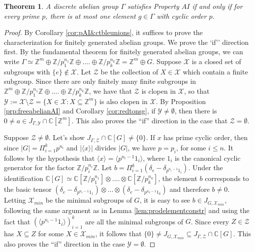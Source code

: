 \documentclass[a4paper, 12pt]{amsart}
\newtheorem{thm}{Theorem}[section]
\theoremstyle{definition}
\theoremstyle{remark}
\numberwithin{equation}{section}
\begin{document}
\begin{thm}
\label{thm:abeliancharAI}
    A discrete abelian group $\Gamma$ satisfies Property $AI$ if and only if for every prime $p$, there is at most one element $g\in \Gamma$ with cyclic order $p$.
\end{thm}
\begin{proof}
    By Corollary \ref{cor:pAI&ctbleunions}, it suffices to prove the characterization for finitely generated abelian groups. We prove the `if'' direction first. By the fundamental theorem for finitely generated abelian groups, we can write $\Gamma\simeq \mathbb{Z}^{m}\oplus \mathbb{Z}/p^{n_{1}}_{1}\mathbb{Z}\oplus....\oplus\mathbb{Z}/p_{k}^{n_{k}}\mathbb{Z} = \mathbb{Z}^{m}\oplus G$. Suppose $\mathcal{X}$ is a closed set of subgroups with $\{e\}\notin \mathcal{X}$. Let $\mathcal{Z}$ be the collection of $X\in\mathcal{X}$ which contain a finite subgroup. Since there are only finitely many finite subgroups in $\mathbb{Z}^{m}\oplus \mathbb{Z}/p^{n_{1}}_{1}\mathbb{Z}\oplus....\oplus\mathbb{Z}/p_{k}^{n_{k}}\mathbb{Z}$, we have that $\mathcal{Z}$ is clopen in $\mathcal{X}$, so that $\mathcal{Y} := \mathcal{X}\setminus \mathcal{Z} = \{X\in \mathcal{X}: X\subseteq \mathbb{Z}^{m}\}$ is also clopen in $\mathcal{X}$. By Proposition \ref{prp:freeabelianAI} and Corollary \ref{cor:redtonsg}, if $\mathcal{Y}\neq \emptyset$, then there is $0\neq a\in J_{\Gamma, \mathcal{Y}}\cap\mathbb{C}[\mathbb{Z}^{m}]$. This also  proves the ``if'' direction in the case that $\mathcal{Z} = \emptyset$.

    Suppose $\mathcal{Z}\neq\emptyset$. Let's show $J_{\Gamma,\mathcal{Z}}\cap\mathbb{C}[G]\neq \{0\}$. If $x$ has prime cyclic order, then since $|G| = \Pi^{k}_{i=1}p^{n_{i}}$ and $|\langle x\rangle|$ divides $|G|$, we have $p = p_{i}$, for some $i\leq n$. It follows by the hypothesis that $\langle x\rangle  = \langle p^{n_{i}-1}1_{i}\rangle $, where $1_{i}$ is the canonical cyclic generator for the factor $\mathbb{Z}/p_{i}^{n_{i}}\mathbb{Z}$. Let $b = \Pi^{k}_{i=1}(\delta_{e} - \delta_{p^{n_{i}-1}1_{i}})$. Under the identification $\mathbb{C}[G]\simeq \mathbb{C}[\mathbb{Z}/p^{n_{1}}_{1}]\otimes....\otimes \mathbb{C}[\mathbb{Z}/p^{n_{k}}_{k}] $, the element $b$ corresponds to the basic tensor $(\delta_{e} - \delta_{p^{n_{1}-1}1_{1}})\otimes...\otimes (\delta_{e} - \delta_{p^{n_{k}-1}1_{k}})$ and therefore $b\neq 0$. Letting $\mathcal{X}_{min}$ be the minimal subgroups of $G$, it is easy to see $b\in J_{G,\mathcal{X}_{min}}$, following the same argument as in Lemma \ref{lem:prodelementconstr} and using the fact that $(\langle p^{n_{i}-1}1_{i}\rangle)^{k}_{i=1}$ are all the minimal subgroups of $G$. Since every $Z\in\mathcal{Z}$ has $X\subseteq Z$ for some $X\in\mathcal{X}_{min}$, it follows that $\{0\}\neq J_{G,\mathcal{X}_{min}}\subseteq J_{\Gamma, \mathcal{Z}}\cap\mathbb{C}[G]$. This also proves the ``if'' direction in the case $\mathcal{Y} = \emptyset$.


\end{proof}
\end{document}
